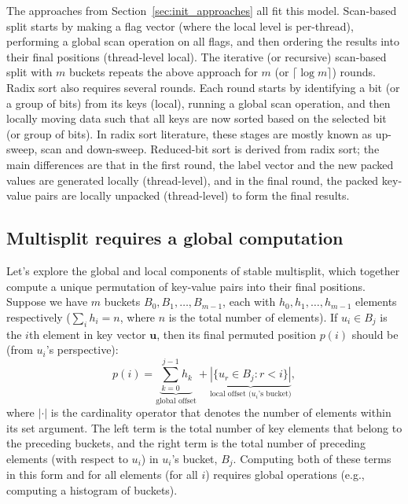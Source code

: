 The approaches from Section~\ref{sec:init_approaches} all fit this model. Scan-based split starts by making a flag vector (where the local level is per-thread), performing a global scan operation on all flags, and then ordering the results into their final positions (thread-level local). The iterative (or recursive) scan-based split with $m$ buckets repeats the above approach for $m$ (or $\lceil \log m \rceil$) rounds.
Radix sort also requires several rounds. Each round starts by identifying a bit (or a group of bits) from its keys (local), running a global scan operation, and then locally moving data such that all keys are now sorted based on the selected bit (or group of bits).
In radix sort literature, these stages are mostly known as up-sweep, scan and down-sweep.
Reduced-bit sort is derived from radix sort; the main differences are that in the first round, the label vector and the new packed values are generated locally (thread-level), and in the final round, the packed key-value pairs are locally unpacked (thread-level) to form the final results.

\subsection{Multisplit requires a global computation}
Let's explore the global and local components of stable multisplit, which together compute a unique permutation of key-value pairs into their final positions.
Suppose we have $m$ buckets $B_0, B_1, \dots, B_{m-1}$, each with $h_0, h_1, \dots, h_{m-1}$ elements respectively ($\sum_i{h_i} = n$, where $n$ is the total number of elements).
If $u_i \in B_j$ is the $i$th element in key vector $\mathbf{u}$, then its final permuted position $p(i)$ should be (from $u_i$'s perspective):
\begin{equation}\label{eq:permutation}
        p(i) = \underbrace{\sum_{k = 0}^{j-1}h_k}_{\text{global offset}} + \underbrace{\left| \{u_r \in B_j: r < i\}\right|}_{\text{local offset ($u_i$'s bucket)}},
\end{equation}
where $|\cdot|$ is the cardinality operator that denotes the number of elements within its set argument. The left term is the total number of key elements that belong to the preceding buckets, and the right term is the total number of preceding elements (with respect to $u_i$) in $u_i$'s bucket, $B_j$.
Computing both of these terms in this form and for all elements (for all $i$) requires global operations (e.g., computing a histogram of buckets).

